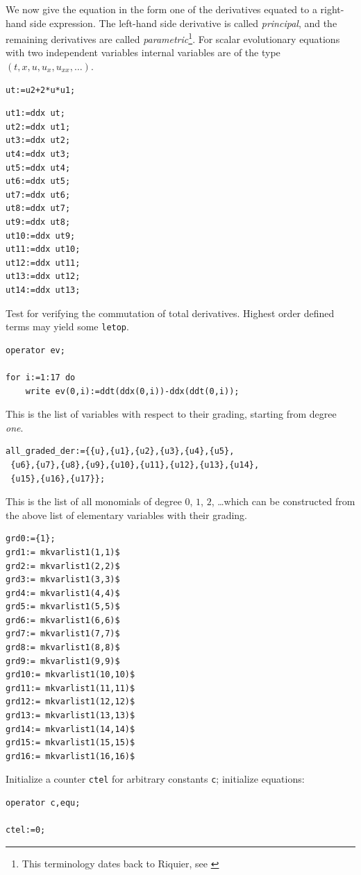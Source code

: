 We now give the equation in the form one of the derivatives equated to a
right-hand side expression. The left-hand side derivative is called
\emph{principal}, and the remaining derivatives are called
\emph{parametric}\footnote{This terminology dates back to Riquier, see
  \cite{Marvan:2009}}.  For scalar
evolutionary equations with two independent variables internal variables are of
the type $(t,x,u,u_x,u_{xx},\ldots)$.
\begin{verbatim}
ut:=u2+2*u*u1;
\end{verbatim}

\begin{verbatim}
ut1:=ddx ut;
ut2:=ddx ut1;
ut3:=ddx ut2;
ut4:=ddx ut3;
ut5:=ddx ut4;
ut6:=ddx ut5;
ut7:=ddx ut6;
ut8:=ddx ut7;
ut9:=ddx ut8;
ut10:=ddx ut9;
ut11:=ddx ut10;
ut12:=ddx ut11;
ut13:=ddx ut12;
ut14:=ddx ut13;
\end{verbatim}

Test for verifying the commutation of total derivatives.
Highest order defined terms may yield some \texttt{letop}.
\begin{verbatim}
operator ev;

for i:=1:17 do
    write ev(0,i):=ddt(ddx(0,i))-ddx(ddt(0,i));
\end{verbatim}

This is the list of variables with respect to their grading,
starting from degree \emph{one}.
\hypertarget{variable:ALL_GRADED_DER}{}
\begin{verbatim}
all_graded_der:={{u},{u1},{u2},{u3},{u4},{u5},
 {u6},{u7},{u8},{u9},{u10},{u11},{u12},{u13},{u14},
 {u15},{u16},{u17}};
\end{verbatim}

This is the list of all monomials of degree $0$, $1$, $2$, \dots which can be
constructed from the above list of elementary variables with their grading.
\hypertarget{operator:MKVARLIST1}{}
\begin{verbatim}
grd0:={1};
grd1:= mkvarlist1(1,1)$
grd2:= mkvarlist1(2,2)$
grd3:= mkvarlist1(3,3)$
grd4:= mkvarlist1(4,4)$
grd5:= mkvarlist1(5,5)$
grd6:= mkvarlist1(6,6)$
grd7:= mkvarlist1(7,7)$
grd8:= mkvarlist1(8,8)$
grd9:= mkvarlist1(9,9)$
grd10:= mkvarlist1(10,10)$
grd11:= mkvarlist1(11,11)$
grd12:= mkvarlist1(12,12)$
grd13:= mkvarlist1(13,13)$
grd14:= mkvarlist1(14,14)$
grd15:= mkvarlist1(15,15)$
grd16:= mkvarlist1(16,16)$
\end{verbatim}

Initialize a counter \texttt{ctel} for arbitrary constants \texttt{c};
initialize equations:
\begin{verbatim}
operator c,equ;

ctel:=0;
\end{verbatim}

